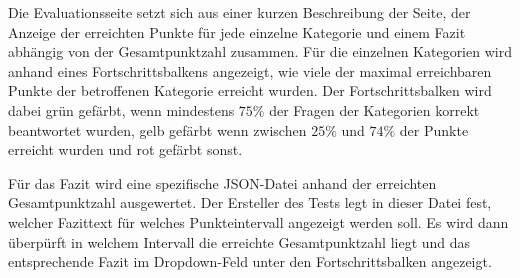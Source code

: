 Die Evaluationsseite setzt sich aus einer kurzen Beschreibung der Seite, der Anzeige der erreichten Punkte für jede einzelne Kategorie und einem Fazit abhängig von der Gesamtpunktzahl zusammen. Für die einzelnen Kategorien wird anhand eines Fortschrittsbalkens angezeigt, wie viele der maximal erreichbaren Punkte der betroffenen Kategorie erreicht wurden. Der Fortschrittsbalken wird dabei grün gefärbt, wenn mindestens $75\%$ der Fragen der Kategorien korrekt beantwortet wurden, gelb gefärbt wenn zwischen $25\%$ und $74\%$ der Punkte erreicht wurden und rot gefärbt sonst.

Für das Fazit wird eine spezifische JSON-Datei anhand der erreichten Gesamtpunktzahl ausgewertet. Der Ersteller des Tests legt in dieser Datei fest, welcher Fazittext für welches Punkteintervall angezeigt werden soll. Es wird dann überpürft in welchem Intervall die erreichte Gesamtpunktzahl liegt und das entsprechende Fazit im Dropdown-Feld unter den Fortschrittsbalken angezeigt. 







